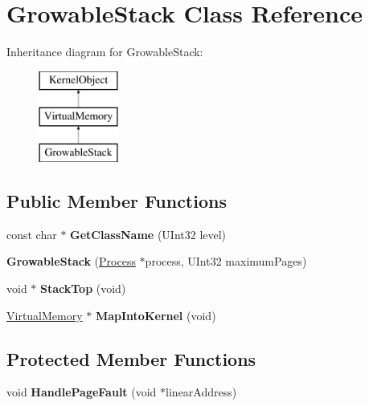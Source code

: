 \hypertarget{class_growable_stack}{}\section{Growable\+Stack Class Reference}
\label{class_growable_stack}
Inheritance diagram for Growable\+Stack\+:\begin{figure}[H]
\begin{center}
\leavevmode
\includegraphics[height=3.000000cm]{class_growable_stack}
\end{center}
\end{figure}
\subsection*{Public Member Functions}
\begin{DoxyCompactItemize}
\item 
\mbox{\label{class_growable_stack_abce61b68dc37ec1599707fdfcc2d71c8}} 
const char $\ast$ {\bfseries Get\+Class\+Name} (U\+Int32 level)
\item 
\mbox{\label{class_growable_stack_a58153cde8bf389e48b0452a7f8d44687}} 
{\bfseries Growable\+Stack} (\hyperlink{class_process}{Process} $\ast$process, U\+Int32 maximum\+Pages)
\item 
\mbox{\label{class_growable_stack_ac65e7f4b6493793184c0a063fdec7ae3}} 
void $\ast$ {\bfseries Stack\+Top} (void)
\item 
\mbox{\label{class_growable_stack_a9db4cdc20c1c07ca26187df034f7298d}} 
\hyperlink{class_virtual_memory}{Virtual\+Memory} $\ast$ {\bfseries Map\+Into\+Kernel} (void)
\end{DoxyCompactItemize}
\subsection*{Protected Member Functions}
\begin{DoxyCompactItemize}
\item 
\mbox{\label{class_growable_stack_a8f21f92acbb14fe4281c201b95d923de}} 
void {\bfseries Handle\+Page\+Fault} (void $\ast$linear\+Address)
\end{DoxyCompactItemize}
